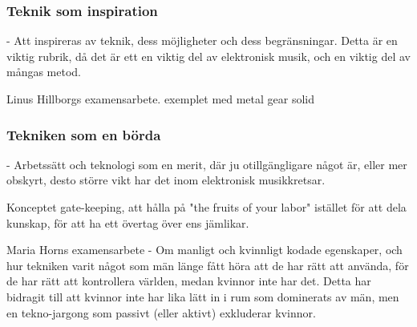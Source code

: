 \documentclass{article}
\begin{document}











\subsubsection{Teknik som inspiration}
- Att inspireras av teknik, dess möjligheter och dess begränsningar. Detta är en viktig rubrik, då det är ett
  en viktig del av elektronisk musik, och en viktig del av mångas metod. 

  Linus Hillborgs examensarbete. exemplet med metal gear solid

\subsubsection{Tekniken som en börda}
- Arbetssätt och teknologi som en merit, där ju otillgängligare något är, eller mer obskyrt, desto större vikt
  har det inom elektronisk musikkretsar. 

  Konceptet gate-keeping, att hålla på "the fruits of your labor" istället för att dela kunskap, för att ha
  ett övertag över ens jämlikar.

  Maria Horns examensarbete - Om manligt och kvinnligt kodade egenskaper, och hur tekniken varit något som män
  länge fått höra att de har rätt att använda, för de har rätt att kontrollera världen, medan kvinnor inte har
  det. Detta har bidragit till att kvinnor inte har lika lätt in i rum som dominerats av män, men en
  tekno-jargong som passivt (eller aktivt) exkluderar kvinnor. 
\end{document}
